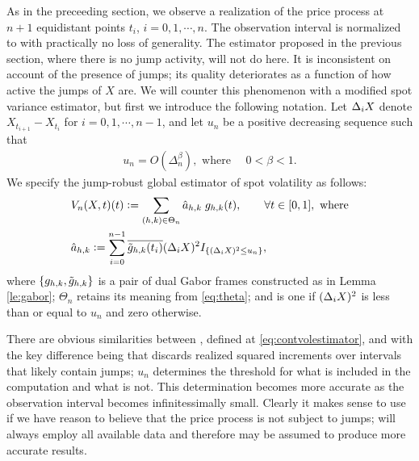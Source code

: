 As in the preceeding section, we observe a realization of the price process at $n + 1$ equidistant points $t_i$,  $i = 0, 1, \cdots, n$. The observation interval is normalized to \domain with practically no loss of generality.  The estimator proposed in the previous section, where there is no jump activity, will not do here. It is inconsistent on account of the presence of jumps; its quality deteriorates as a function of how active the jumps of $X$ are. We will counter this phenomenon with a modified spot variance estimator, but first we introduce the following notation. Let $\Delta_i X$ denote $X_{t_{i+1}} - X_{t_i}$ for $i = 0, 1,\cdots, n-1$, and let $u_n$  be a positive decreasing sequence such that 
\begin{align}
  u_n  = O(\Delta_n^\beta), \text{ where }\quad 0< \beta < 1.  
  \label{}
\end{align}
 We specify the jump-robust global estimator of  spot volatility as follows: 
\begin{align}
  \label{eq:jumpvolestimator}
  &V_n(X, t)(t) := \sum_{(h,k) \in \Theta_n} \hat{a}_{h,k}\;g_{h,k}(t), \qquad \forall t \in [0,1], \text{ where}\\
  &\hat{a}_{h,k} := \sum_{i =0}^{n-1} \overline{\tilde{g}_{h,k}(t_i)} (\Delta_i X)^2 I_{\{(\Delta_i X)^2 \le u_n\}},
\end{align}
where $\{g_{h,k}, \tilde{g}_{h,k}\}$ is a pair of dual Gabor frames constructed as in Lemma \eqref{le:gabor}; $\Theta_n$ retains its meaning from \eqref{eq:theta}; and \indx is one if $(\Delta_i X)^2$ is less than or equal to  $u_n$ and zero otherwise.  


There are obvious similarities between \svnx, defined at  \eqref{eq:contvolestimator},  and \jvn with the key difference being that \jvn discards realized squared increments over intervals that likely contain jumps; $u_n$ determines the threshold for what is included in the computation and what is not. This determination becomes more accurate as the observation interval becomes infinitessimally small. Clearly it makes sense to use \svnx if we have reason to believe that the price process is not subject to jumps; \svnx will always employ   all available data and therefore may be assumed to produce more accurate results.  


